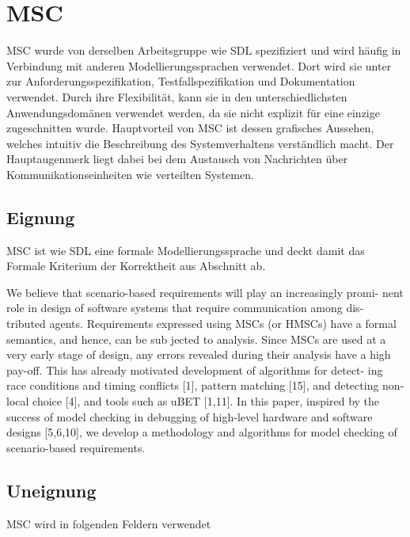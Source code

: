 \section{MSC}
\label{sc:MSCB}
\ac{MSC} wurde von derselben Arbeitsgruppe wie \ac{SDL} spezifiziert und wird häufig in Verbindung mit anderen Modellierungssprachen verwendet. Dort wird sie unter zur Anforderungsspezifikation, Testfallspezifikation und Dokumentation verwendet. Durch ihre Flexibilität, kann sie in den unterschiedlichsten Anwendungsdomänen verwendet werden, da sie nicht explizit für eine einzige zugeschnitten wurde. Hauptvorteil von \ac{MSC} ist dessen grafisches Aussehen, welches intuitiv die Beschreibung des Systemverhaltens verständlich macht. Der Hauptaugenmerk liegt dabei bei dem Austausch von Nachrichten über Kommunikationseinheiten wie verteilten Systemen.
\subsection{Eignung}
\label{sc:MSCEignung}
\ac{MSC} ist wie \ac{SDL} eine formale Modellierungssprache und deckt damit das Formale Kriterium der Korrektheit aus Abschnitt \pageref{ssc:Korrektheit} ab. 


We believe that scenario-based requirements will play an increasingly promi-
nent role in design of software systems that require communication among dis-
tributed agents. Requirements expressed using MSCs (or HMSCs) have a formal
semantics, and hence, can be sub jected to analysis. Since MSCs are used at
a very early stage of design, any errors revealed during their analysis have a
high pay-oﬀ. This has already motivated development of algorithms for detect-
ing race conditions and timing conﬂicts [1], pattern matching [15], and detecting
non-local choice [4], and tools such as uBET [1,11]. In this paper, inspired by
the success of model checking in debugging of high-level hardware and software
designs [5,6,10], we develop a methodology and algorithms for model checking
of scenario-based requirements.
\subsection{Uneignung}
\label{sc:MSCUnEignung}


MSC wird in folgenden Feldern verwendet
